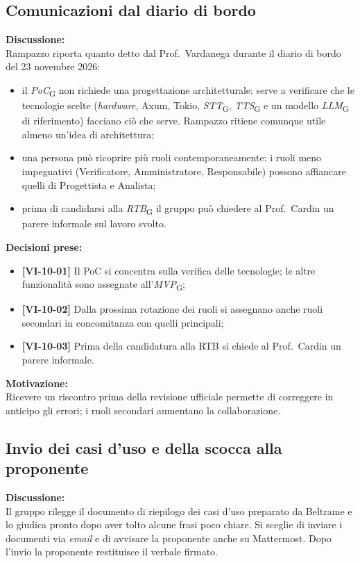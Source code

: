 \documentclass[12pt,a4paper]{article}
\newcommand{\vnum}{10}                     %
\newcommand{\gl}[1]{\emph{#1}\textsubscript{\scriptsize G}}       %
\newcommand{\tightlist}{\setlength{\itemsep}{1pt}\setlength{\parskip}{0pt}}
\begin{document}
\hypertarget{odg-1}{%
\subsection{Comunicazioni dal diario di bordo}}

\textbf{Discussione:}\\
Rampazzo riporta quanto detto dal Prof.\ Vardanega durante il diario di bordo del 23 novembre 2026:
\begin{itemize}
\tightlist
\item il \gl{PoC} non richiede una progettazione architetturale: serve a verificare che le tecnologie scelte (\emph{hardware}, Axum, Tokio, \gl{STT}, \gl{TTS} e un modello \gl{LLM} di riferimento) facciano ciò che serve. Rampazzo ritiene comunque utile almeno un'idea di architettura;
\item una persona può ricoprire più ruoli contemporaneamente: i ruoli meno impegnativi (Verificatore, Amministratore, Responsabile) possono affiancare quelli di Progettista e Analista;
\item prima di candidarsi alla \gl{RTB} il gruppo può chiedere al Prof.\ Cardin un parere informale sul lavoro svolto.
\end{itemize}

\textbf{Decisioni prese:}
\begin{itemize}
\tightlist
\item[$\checkmark$] \textbf{[VI-\vnum-01]} Il PoC si concentra sulla verifica delle tecnologie; le altre funzionalità sono assegnate all'\gl{MVP};
\item[$\checkmark$] \textbf{[VI-\vnum-02]} Dalla prossima rotazione dei ruoli si assegnano anche ruoli secondari in concomitanza con quelli principali;
\item[$\checkmark$] \textbf{[VI-\vnum-03]} Prima della candidatura alla RTB si chiede al Prof.\ Cardin un parere informale.
\end{itemize}

\textbf{Motivazione:}\\
Ricevere un riscontro prima della revisione ufficiale permette di correggere in anticipo gli errori; i ruoli secondari aumentano la collaborazione.

\hypertarget{odg-2}{%
\subsection{Invio dei casi d'uso e della scocca alla proponente}}

\textbf{Discussione:}\\
Il gruppo rilegge il documento di riepilogo dei casi d'uso preparato da Beltrame e lo giudica pronto dopo aver tolto alcune frasi poco chiare. Si sceglie di inviare i documenti via \emph{email} e di avvisare la proponente anche su Mattermost. Dopo l'invio la proponente restituisce il verbale firmato.
\end{document}
